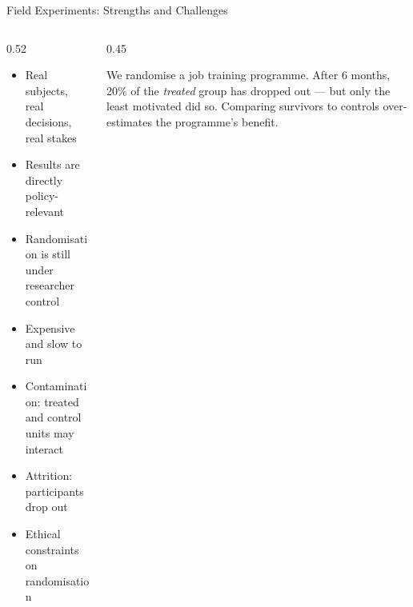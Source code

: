 \documentclass[aspectratio=169, 11pt]{beamer}
\begin{document}
\begin{frame}[t]{Field Experiments: Strengths and Challenges}
\begin{columns}[T]
\begin{column}{0.52\textwidth}
\begin{itemize}
  \setlength\itemsep{0.4em}
  \item[\textcolor{okabegreen}{\textbf{+}}] Real subjects, real decisions, real stakes
  \item[\textcolor{okabegreen}{\textbf{+}}] Results are directly policy-relevant
  \item[\textcolor{okabegreen}{\textbf{+}}] Randomisation is still under researcher control
  \item[\textcolor{okabevermillion}{\textbf{--}}] Expensive and slow to run
  \item[\textcolor{okabevermillion}{\textbf{--}}] Contamination: treated and control units may interact
  \item[\textcolor{okabevermillion}{\textbf{--}}] Attrition: participants drop out
  \item[\textcolor{okabevermillion}{\textbf{--}}] Ethical constraints on randomisation
\end{itemize}
\end{column}
\begin{column}{0.45\textwidth}
  \begin{warningbox}
    \small
    We randomise a job training programme. After 6 months, 20\% of the
    \emph{treated} group has dropped out --- but only the least motivated did so.
    Comparing survivors to controls over-estimates the programme's benefit.
  \end{warningbox}
\end{column}
\end{columns}
\end{frame}
\end{document}
